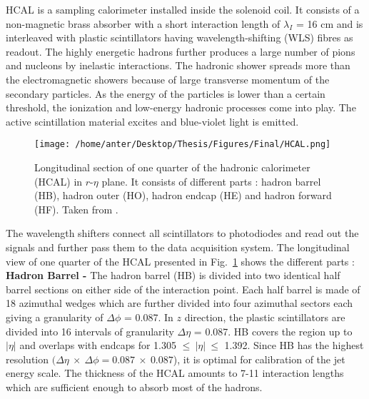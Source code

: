 HCAL is a sampling calorimeter installed inside the solenoid coil. It consists of a non-magnetic brass absorber with a short interaction length of $\lambda_I$ = 16 cm and is interleaved with plastic scintillators having wavelength-shifting (WLS) fibres as readout. The highly energetic hadrons further produces a large number of pions and nucleons by inelastic interactions. The hadronic shower spreads more than the electromagnetic showers because of large transverse momentum of the secondary particles. As the energy of the particles is lower than a certain threshold, the ionization and low-energy hadronic processes come into play. The active scintillation material excites and blue-violet light is emitted. 
\begin{figure}[!h]
\begin{center}
\vspace*{3mm} 
\hspace*{-5mm}
\texttt{[image: /home/anter/Desktop/Thesis/Figures/Final/HCAL.png]}\\
\vspace*{4mm}
\caption[Longitudinal section of one quarter of the hadronic calorimeter (HCAL) in $r$-$\eta$ plane.]{Longitudinal section of one quarter of the hadronic calorimeter (HCAL) in $r$-$\eta$ plane. It consists of different parts : hadron barrel (HB), hadron outer (HO), hadron endcap (HE) and hadron forward (HF). Taken from \cite{Chatrchyan:2008aa}.}
\label{fig:hcal}
\end{center}
\end{figure}
The wavelength shifters connect all scintillators to photodiodes and read out the signals and further pass them to the data acquisition system. The longitudinal view of one quarter of the HCAL presented in Fig.~\ref{fig:hcal} shows the different parts : \\\newline
{\bf Hadron Barrel -} The hadron barrel (HB) is divided into two identical half barrel sections on either side of the interaction point. Each half barrel is made of 18 azimuthal wedges which are further divided into four azimuthal sectors each giving a granularity of $\Delta\phi$ = 0.087. In $z$ direction, the plastic scintillators are divided into 16 intervals of granularity $\Delta\eta$ = 0.087. HB covers the region up to $|\eta|$  and overlaps with endcaps for 1.305 $\leq~|\eta|~\leq$ 1.392. Since HB has the highest resolution $(\Delta\eta~\times~\Delta\phi = 0.087~\times~0.087$), it is optimal for calibration of the jet energy scale. The thickness of the HCAL amounts to 7-11 interaction lengths which are sufficient enough to absorb most of the hadrons.\\\newline
